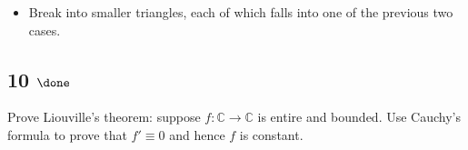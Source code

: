 \begin{solution}
\begin{itemize}
  \begin{itemize}
  \tightlist
  \item
    Break into smaller triangles, each of which falls into one of the
    previous two cases.
  \end{itemize}
\end{itemize}

\end{solution}

\hypertarget{done-2}{%
\subsection{\texorpdfstring{10
\(\done\)}{10 \textbackslash done}}\label{done-2}}

Prove Liouville's theorem: suppose \(f:{\mathbb{C}}\to{\mathbb{C}}\) is
entire and bounded. Use Cauchy's formula to prove that \(f'\equiv 0\)
and hence \(f\) is constant.

